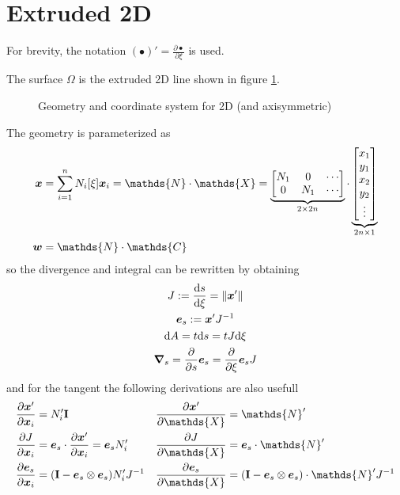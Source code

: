 \documentclass[a4paper,11pt]{article}
\renewcommand{\to}[1]{\text{\boldmath $#1$}} %
\newcommand{\ts}[1]{\text{\boldmath $\mathrm{#1}$}} %
\newcommand{\uv}[1]{\mathds{#1}}
\newcommand{\um}[1]{\mathds{#1}}
\newcommand{\intd}[1]{\mathrm{d}#1}
\newcommand{\pderiv}[2]{\frac{\partial#1}{\partial#2}}
\newcommand{\dderiv}[2]{\frac{\mathrm{d}#1}{\mathrm{d}#2}}
\newcommand{\norm}[1]{\left\lVert{#1}\right\rVert}
\newcommand{\defeq}{:=}
\begin{document}
\section{Extruded 2D}
For brevity, the notation $(\bullet)' = \pderiv{\bullet}{\xi}$ is used.

The surface $\Omega$ is the extruded 2D line shown in figure \ref{fig:extruded}.
\begin{figure}[htpb]
 \centering
 \caption{Geometry and coordinate system for 2D (and axisymmetric)}
 \label{fig:extruded}
\end{figure}

The geometry is parameterized as
\begin{align}
 \to x &= \sum_{i=1}^n N_i[\xi]\to x_i
  = \um N \cdot \uv X
  = \underbrace{\begin{bmatrix}N_1 & 0 & \cdots\\ 0 & N_1 & \cdots \end{bmatrix}}_{2\times 2n}\cdot \underbrace{\begin{bmatrix}x_1\\y_1\\x_2\\y_2\\ \vdots\end{bmatrix}}_{2n\times 1}\\
 \to w &= \um N\cdot \uv C
\end{align}
so the divergence and integral can be rewritten by obtaining
\begin{gather}
 J \defeq \dderiv{s}{\xi} = \norm{\to x'}\\
 \to e_s \defeq \to x' J^{-1}\\
 \intd A = t \intd s = t J \intd \xi     \label{eq:intdA_2d}\\
 \to \nabla_s = \pderiv{}{s}\to e_s = \pderiv{}{\xi}\to e_s J    \label{eq:nabla_s_2d}
\end{gather}
and for the tangent the following derivations are also usefull
\begin{align}
 \pderiv{\to x'}{\to x_i} &= N_i' \ts I & \pderiv{\to x'}{\uv X} &= \um N'\\
 \pderiv{J}{\to x_i} &= \to e_s \cdot \pderiv{\to x'}{\to x_i} = \to e_s N_i'  & \pderiv{J}{\uv X} &= \to e_s\cdot \um N' \\
 \pderiv{\to e_s}{\to x_i} &= (\ts I - \to e_s\otimes\to e_s)N_i' J^{-1} &  \pderiv{\to e_s}{\uv X} &= (\ts I - \to e_s\otimes \to e_s)\cdot \um N' J^{-1}
\end{align}
\end{document}
